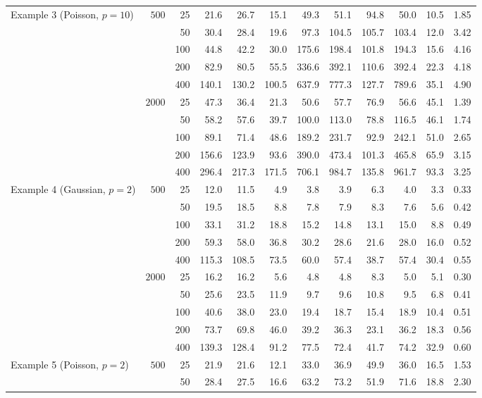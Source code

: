 \begin{tabular}{lrrrrrrrrrrr}
\addlinespace
Example 3 (Poisson, $p=10$) & $500$ & 25 & 21.6 & 26.7 & 15.1 & 49.3 & 51.1 & 94.8 & 50.0 & 10.5 & 1.85\\
 &  & 50 & 30.4 & 28.4 & 19.6 & 97.3 & 104.5 & 105.7 & 103.4 & 12.0 & 3.42\\
 &  & 100 & 44.8 & 42.2 & 30.0 & 175.6 & 198.4 & 101.8 & 194.3 & 15.6 & 4.16\\
 &  & 200 & 82.9 & 80.5 & 55.5 & 336.6 & 392.1 & 110.6 & 392.4 & 22.3 & 4.18\\
 &  & 400 & 140.1 & 130.2 & 100.5 & 637.9 & 777.3 & 127.7 & 789.6 & 35.1 & 4.90\\
 & $2000$ & 25 & 47.3 & 36.4 & 21.3 & 50.6 & 57.7 & 76.9 & 56.6 & 45.1 & 1.39\\
 &  & 50 & 58.2 & 57.6 & 39.7 & 100.0 & 113.0 & 78.8 & 116.5 & 46.1 & 1.74\\
 &  & 100 & 89.1 & 71.4 & 48.6 & 189.2 & 231.7 & 92.9 & 242.1 & 51.0 & 2.65\\
 &  & 200 & 156.6 & 123.9 & 93.6 & 390.0 & 473.4 & 101.3 & 465.8 & 65.9 & 3.15\\
 &  & 400 & 296.4 & 217.3 & 171.5 & 706.1 & 984.7 & 135.8 & 961.7 & 93.3 & 3.25\\
\addlinespace
Example 4 (Gaussian, $p=2$) & $500$ & 25 & 12.0 & 11.5 & 4.9 & 3.8 & 3.9 & 6.3 & 4.0 & 3.3 & 0.33\\
 &  & 50 & 19.5 & 18.5 & 8.8 & 7.8 & 7.9 & 8.3 & 7.6 & 5.6 & 0.42\\
 &  & 100 & 33.1 & 31.2 & 18.8 & 15.2 & 14.8 & 13.1 & 15.0 & 8.8 & 0.49\\
 &  & 200 & 59.3 & 58.0 & 36.8 & 30.2 & 28.6 & 21.6 & 28.0 & 16.0 & 0.52\\
 &  & 400 & 115.3 & 108.5 & 73.5 & 60.0 & 57.4 & 38.7 & 57.4 & 30.4 & 0.55\\
 & $2000$ & 25 & 16.2 & 16.2 & 5.6 & 4.8 & 4.8 & 8.3 & 5.0 & 5.1 & 0.30\\
 &  & 50 & 25.6 & 23.5 & 11.9 & 9.7 & 9.6 & 10.8 & 9.5 & 6.8 & 0.41\\
 &  & 100 & 40.6 & 38.0 & 23.0 & 19.4 & 18.7 & 15.4 & 18.9 & 10.4 & 0.51\\
 &  & 200 & 73.7 & 69.8 & 46.0 & 39.2 & 36.3 & 23.1 & 36.2 & 18.3 & 0.56\\
 &  & 400 & 139.3 & 128.4 & 91.2 & 77.5 & 72.4 & 41.7 & 74.2 & 32.9 & 0.60\\
\addlinespace
Example 5 (Poisson, $p=2$) & $500$ & 25 & 21.9 & 21.6 & 12.1 & 33.0 & 36.9 & 49.9 & 36.0 & 16.5 & 1.53\\
 &  & 50 & 28.4 & 27.5 & 16.6 & 63.2 & 73.2 & 51.9 & 71.6 & 18.8 & 2.30\\

\end{tabular}
